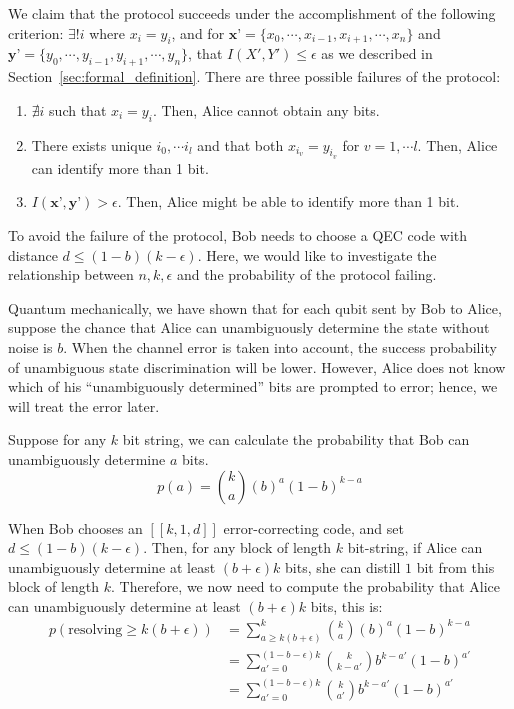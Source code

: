 \documentclass[%
 reprint,
superscriptaddress,
 amsmath,amssymb,
 aps,
]{revtex4-2}
\begin{document}
We claim that the protocol succeeds under the accomplishment of the following criterion: $\exists! i$ where $x_i=y_i$, and for $\textbf{x'}=\{x_0, \cdots, x_{i-1}, x_{i+1}, \cdots, x_n\}$ and $\textbf{y'}=\{y_0, \cdots, y_{i-1}, y_{i+1}, \cdots, y_n\}$, that $I(X', Y')\le \epsilon$ as we described in Section~\ref{sec:formal_definition}. There are three possible failures of the protocol:
\begin{enumerate}
    \item $\nexists i$ such that $x_i=y_i$. Then, Alice cannot obtain any bits.

    \item There exists unique $i_0, \cdots i_l$ and that both $x_{i_v}=y_{i_v}$ for $v=1, \cdots l$. Then, Alice can identify more than 1 bit.

    \item $I(\textbf{x'}, \textbf{y'})>\epsilon$. Then, Alice might be able to identify more than 1 bit.
\end{enumerate}


To avoid the failure of the protocol, Bob needs to choose a QEC code with distance $d\le (1-b)(k-\epsilon)$. Here, we would like to investigate the relationship between $n, k, \epsilon$ and the probability of the protocol failing.

Quantum mechanically, we have shown that for each qubit sent by Bob to Alice, suppose the chance that Alice can unambiguously determine the state without noise is $b$. When the channel error is taken into account, the success probability of unambiguous state discrimination will be lower. However, Alice does not know which of his ``unambiguously determined'' bits are prompted to error; hence, we will treat the error later.


Suppose for any $k$ bit string, we can calculate the probability that Bob can unambiguously determine $a$ bits.
\begin{equation}
    p(a) = \binom{k}{a} \left(b\right)^a\left(1-b\right)^{k-a}
\end{equation}

When Bob chooses an $[[k, 1, d]]$ error-correcting code, and set $d \le(1-b)(k-\epsilon)$. Then, for any block of length $k$ bit-string, if Alice can unambiguously determine at least $(b+\epsilon)k$ bits, she can distill $1$ bit from this block of length $k$. Therefore, we now need to compute the probability that Alice can unambiguously determine at least $\left(b+\epsilon\right)k$ bits, this is:
\begin{equation}
\begin{split}
    p(\text{resolving}\ge k(b+\epsilon)) &= \sum_{a\ge k(b+\epsilon)}^k \binom{k}{a}\left(b\right)^a\left(1-b\right)^{k-a}\\
    &=\sum_{a'=0}^{(1-b-\epsilon)k}\binom{k}{k-a'}b^{k-a'}(1-b)^{a'}\\
    &=\sum_{a'=0}^{(1-b-\epsilon)k}\binom{k}{a'}b^{k-a'}(1-b)^{a'}
\end{split}
\end{equation}
\end{document}
